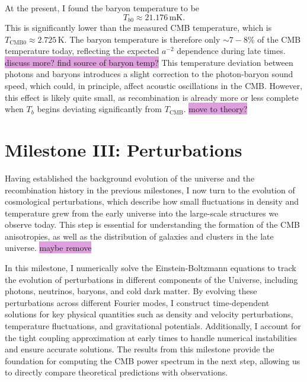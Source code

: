 \documentclass{aa}
\begin{document}
At the present, I found the baryon temperature to be
\begin{equation*}
T_{b0} \approx 21.176\,\text{mK}.
\end{equation*}
This is significantly lower than the measured CMB temperature, which is $T_\text{CMB0} \approx 2.725 \,$K. The baryon temperature is therefore only $ \sim 7-8\% $ of the CMB temperature today, reflecting the expected $a^{-2}$ dependence during late times. \colorbox{Plum}{discuss more? find source of baryon temp?} This temperature deviation between photons and baryons introduces a slight correction to the photon-baryon sound speed, which could, in principle, affect acoustic oscillations in the CMB. However, this effect is likely quite small, as recombination is already more or less complete when $T_b$ begins deviating significantly from $T_\text{CMB}$. \colorbox{Plum}{move to theory?}








\section{Milestone III: Perturbations}\label{sec: milestone III}
Having established the background evolution of the universe and the recombination history in the previous milestones, I now turn to the evolution of cosmological perturbations, which describe how small fluctuations in density and temperature grew from the early universe into the large-scale structures we observe today. This step is essential for understanding the formation of the CMB anisotropies, as well as the distribution of galaxies and clusters in the late universe. \colorbox{Plum}{maybe remove}

In this milestone, I numerically solve the Einstein-Boltzmann equations to track the evolution of perturbations in different components of the Universe, including photons, neutrinos, baryons, and cold dark matter. By evolving these perturbations across different Fourier modes, I construct time-dependent solutions for key physical quantities such as density and velocity perturbations, temperature fluctuations, and gravitational potentials. Additionally, I account for the tight coupling approximation at early times to handle numerical instabilities and ensure accurate solutions. The results from this milestone provide the foundation for computing the CMB power spectrum in the next step, allowing us to directly compare theoretical predictions with observations.
\end{document}
